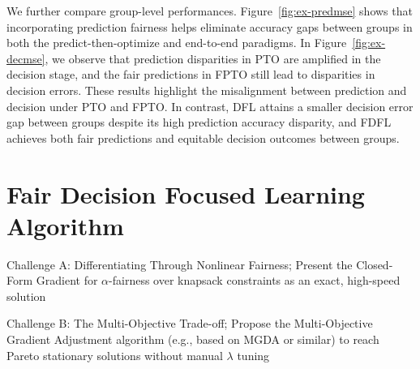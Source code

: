 \documentclass[ijoc,sglanonrev]{informs4}
\begin{document}
We further compare group-level performances. Figure~\ref{fig:ex-predmse} shows that incorporating prediction fairness helps eliminate accuracy gaps between groups in both the predict-then-optimize and end-to-end paradigms. In Figure~\ref{fig:ex-decmse}, we observe that prediction disparities in PTO are amplified in the decision stage, and the fair predictions in FPTO still lead to disparities in decision errors. These results highlight the misalignment between prediction and decision under PTO and FPTO. In contrast, DFL attains a smaller decision error gap between groups despite its high prediction accuracy disparity, and FDFL achieves both fair predictions and equitable decision outcomes between groups.

\section{Fair Decision Focused Learning Algorithm} \label{sec:FDFL-alg}
{\color{blue}
Challenge A: Differentiating Through Nonlinear Fairness; Present the Closed-Form Gradient for $\alpha$-fairness over knapsack constraints as an exact, high-speed solution

Challenge B: The Multi-Objective Trade-off; Propose the Multi-Objective Gradient Adjustment algorithm (e.g., based on MGDA or similar) to reach Pareto stationary solutions without manual $\lambda$ tuning
}
\end{document}
